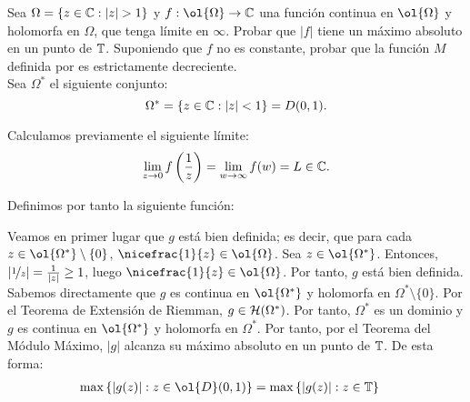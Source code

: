 \begin{ejercicio}
    Sea $\Omega = \{z\in \mathbb{C} : |z| > 1\}$ y $f : \ol{\Omega} \to \bb{C}$ una función continua en $\ol{\Omega}$ y holomorfa en $\Omega$, que tenga límite en $\infty$. Probar que $|f|$ tiene un máximo absoluto en un punto de $\mathbb{T}$. Suponiendo que $f$ no es constante, probar que la función $M$ definida por
    \Func{M}{\left[1,+\infty\right[}{\bb{R}}{r}{\max\left\{ |f(z)| : z\in C(0,r)^* \right\}}
    es estrictamente decreciente.\\

    Sea $\Omega^*$ el siguiente conjunto:
    \begin{equation*}
        \Omega^* = \left\{ z\in \mathbb{C} : |z| < 1 \right\} = D(0,1).
    \end{equation*}

    Calculamos previamente el siguiente límite:
    \begin{equation*}
        \lim_{z\to 0} f\left(\frac{1}{z}\right) = \lim_{w\to \infty} f(w) = L \in \mathbb{C}.
    \end{equation*}

    Definimos por tanto la siguiente función:

    Veamos en primer lugar que $g$ está bien definida; es decir, que para cada $z\in \ol{\Omega^*}\setminus \{0\}$, $\nicefrac{1}{z}\in \ol{\Omega}$. Sea $z\in \ol{\Omega^*}$. Entonces, $|\nicefrac{1}{z}| = \frac{1}{|z|}\geq 1$, luego $\nicefrac{1}{z}\in \ol{\Omega}$. Por tanto, $g$ está bien definida.\\

    Sabemos directamente que $g$ es continua en $\ol{\Omega^*}$ y holomorfa en $\Omega^*\setminus \{0\}$. Por el Teorema de Extensión de Riemman, $g\in \mathcal{H}(\Omega^*)$. Por tanto, $\Omega^*$ es un dominio y $g$ es continua en $\ol{\Omega^*}$ y holomorfa en $\Omega^*$. Por tanto, por el Teorema del Módulo Máximo, $|g|$ alcanza su máximo absoluto en un punto de $\mathbb{T}$. De esta forma:
    \begin{align*}
        \max\left\{ |g(z)| : z\in \ol{D}(0,1) \right\} &= \max\left\{ |g(z)| : z\in \bb{T} \right\}
    \end{align*}


\end{ejercicio}
